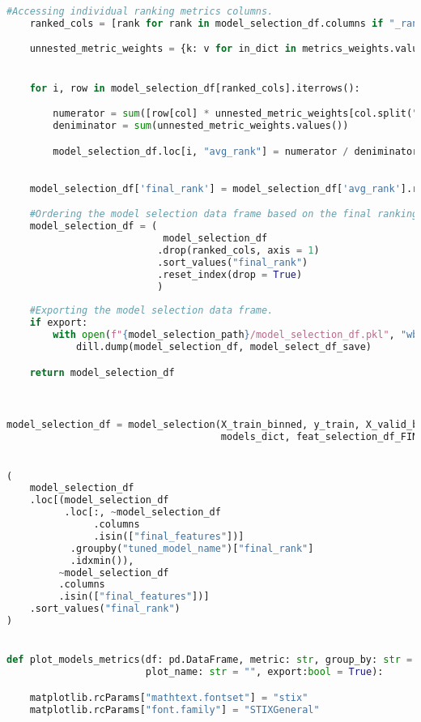 \begin{lstlisting}[language=Python, basicstyle=\footnotesize\ttfamily]
    #Accessing individual ranking metrics columns.
    ranked_cols = [rank for rank in model_selection_df.columns if "_rank" in rank]

    unnested_metric_weights = {k: v for in_dict in metrics_weights.values() for k, v in in_dict.items()}


    for i, row in model_selection_df[ranked_cols].iterrows():

        numerator = sum([row[col] * unnested_metric_weights[col.split("_")[0]] for col in ranked_cols])
        deniminator = sum(unnested_metric_weights.values())

        model_selection_df.loc[i, "avg_rank"] = numerator / deniminator
        

    model_selection_df['final_rank'] = model_selection_df['avg_rank'].rank(ascending = True)

    #Ordering the model selection data frame based on the final ranking.
    model_selection_df = (
                           model_selection_df
                          .drop(ranked_cols, axis = 1)
                          .sort_values("final_rank")
                          .reset_index(drop = True)
                          )
    
    #Exporting the model selection data frame.
    if export:
        with open(f"{model_selection_path}/model_selection_df.pkl", "wb") as model_select_df_save:
            dill.dump(model_selection_df, model_select_df_save)

    return model_selection_df



model_selection_df = model_selection(X_train_binned, y_train, X_valid_binned, y_valid,
                                     models_dict, feat_selection_df_FINAL, seed, metrics_weights)


(
    model_selection_df
    .loc[(model_selection_df
          .loc[:, ~model_selection_df
               .columns
               .isin(["final_features"])]
           .groupby("tuned_model_name")["final_rank"]
           .idxmin()), 
         ~model_selection_df
         .columns
         .isin(["final_features"])]
    .sort_values("final_rank")
)


def plot_models_metrics(df: pd.DataFrame, metric: str, group_by: str = "tuned_model_name",
                        plot_name: str = "", export:bool = True):

    matplotlib.rcParams["mathtext.fontset"] = "stix"
    matplotlib.rcParams["font.family"] = "STIXGeneral"


\end{lstlisting}
